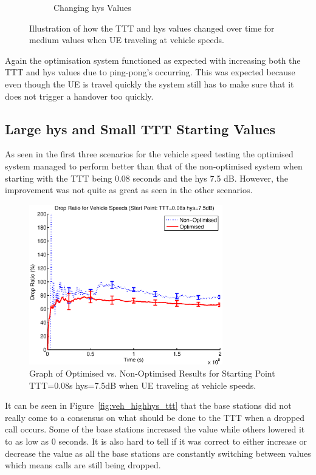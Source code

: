 \begin{figure}[H]
\begin{subfigure}[b]{0.49\textwidth}
                \caption{Changing hys Values}
                \label{fig:veh_low_hys}
        \end{subfigure}
        \caption{Illustration of how the TTT and hys values changed over time for medium values when UE traveling at vehicle speeds.}\label{fig:vel_low_ttthys}
\end{figure}
Again the optimisation system functioned as expected with increasing both the TTT and hys values due to ping-pong’s occurring. This was expected because even though the UE is travel quickly the system still has to make sure that it does not trigger a handover too quickly.
\subsection{Large hys and Small TTT Starting Values}
As seen in the first three scenarios for the vehicle speed testing the optimised system managed to perform better than that of the non-optimised system when starting with the TTT being 0.08 seconds and the hys 7.5 dB. However, the improvement was not quite as great as seen in the other scenarios. 
\begin{figure}[H]
  \begin{center}
    	  \includegraphics[width=0.75\textwidth]{figures/vehicle_figures/vehhighhys.eps}
    \end{center}
    \caption{Graph of Optimised vs. Non-Optimised Results for Starting Point TTT=0.08s hys=7.5dB when UE traveling at vehicle speeds.}
    \label{fig:veh_highhys_drop}
\end{figure}
It can be seen in Figure~\ref{fig:veh_highhys_ttt} that the base stations did not really come to a consensus on what should be done to the TTT when a dropped call occurs. Some of the base stations increased the value while others lowered it to as low as 0 seconds. It is also hard to tell if it was correct to either increase or decrease the value as all the base stations are constantly switching between values which means calls are still being dropped.

